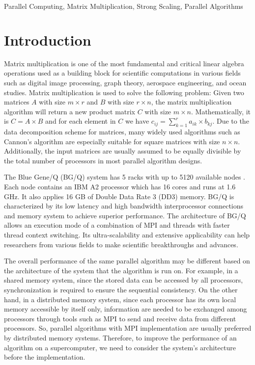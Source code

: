 \documentclass[conference]{IEEEtran}
\begin{document}
\begin{IEEEkeywords}
Parallel Computing, Matrix Multiplication, Strong Scaling, Parallel Algorithms
\end{IEEEkeywords}

\section{Introduction}\label{introduction}
Matrix multiplication is one of the most fundamental and critical linear algebra operations used as a building block for scientific computations in various fields such as digital image processing, graph theory\cite{b2}, aerospace engineering, and ocean studies\cite{b3}.  Matrix multiplication is used to solve the following problem: Given two matrices $A$ with size $m \times r$ and $B$ with size $r \times n$, the matrix multiplication algorithm will return a new product matrix $C$ with size $m \times n$. Mathematically, it is $C = A \times B$ and for each element in $C$ we have $c_{ij} = \sum_{k =1}^{r} a_{ik} \times b_{kj}$. Due to the data decomposition scheme for matrices, many widely used algorithms such as Cannon's algorithm \cite{b4} are especially suitable for square matrices with size $n \times n$. Additionally, the input matrices are usually assumed to be equally divisible by the total number of processors in most parallel algorithm designs.

The Blue Gene/Q (BG/Q) system has 5 racks with up to 5120 available nodes \cite{b5}. Each node contains an IBM A2 processor which has 16 cores and runs at 1.6 GHz. It also applies 16 GB of Double Data Rate 3 (DD3) memory. BG/Q is characterized by its low latency and high bandwidth interprocessor connections and memory system to achieve superior performance.  The architecture of BG/Q allows an execution mode of a combination of MPI and threads with faster thread context switching. Its ultra-scalability and extensive applicability can help researchers from various fields to make scientific breakthroughs and advances\cite{b5}. 

The overall performance of the same parallel algorithm may be different based on the architecture of the system that the algorithm is run on. For example, in a shared memory system, since the stored data can be accessed by all processors, synchronization is required to ensure the sequential consistency. On the other hand, in a distributed memory system, since each processor has its own local memory accessible by itself only, information are needed to be exchanged among processors through tools such as MPI to send and receive data from different processors\cite{b2}. So, parallel algorithms with MPI implementation are usually preferred by distributed memory systems. Therefore, to improve the performance of an algorithm on a supercomputer, we need to consider the system's architecture before the implementation.
\end{document}
